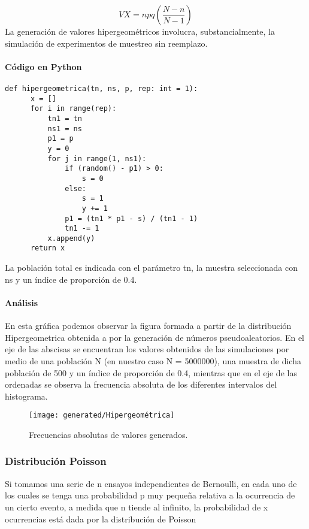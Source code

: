 \documentclass{article}
\begin{document}
  \begin{equation}
    VX = npq(\frac{N-n}{N-1})
    \end{equation}
  La generación de valores hipergeométricos involucra, substancialmente, la simulación de experimentos de muestreo sin reemplazo.

  \paragraph{Código en Python}
  \begin{lstlisting}[style = Python]
   def hipergeometrica(tn, ns, p, rep: int = 1):
      x = []
      for i in range(rep):
          tn1 = tn
          ns1 = ns
          p1 = p
          y = 0
          for j in range(1, ns1):
              if (random() - p1) > 0:
                  s = 0
              else:
                  s = 1
                  y += 1
              p1 = (tn1 * p1 - s) / (tn1 - 1)
              tn1 -= 1
          x.append(y)
      return x
  \end{lstlisting}
  La población total es indicada con el parámetro tn, la muestra seleccionada con ns y un índice de proporción de 0.4.

  \paragraph{Análisis\newline}

  En esta gráfica podemos observar la figura formada a partir de la distribución Hipergeometrica obtenida a
  por la generación de números pseudoaleatorios. En el eje de las abscisas se encuentran los valores obtenidos de las
  simulaciones por medio de una población N (en nuestro caso N = 5000000), una muestra de dicha población de 500 y un
  índice de proporción de 0.4, mientras que en el eje de las  ordenadas se observa la frecuencia absoluta de los
  diferentes intervalos del histograma.
  \begin{figure}[h]
    \centering
    \texttt{[image: generated/Hipergeométrica]}
    \caption{Frecuencias absolutas de valores generados.}
  \end{figure}






  \subsubsection{Distribución Poisson}
  Si tomamos una serie de n ensayos independientes de Bernoulli, en cada uno de los cuales se tenga una probabilidad p muy pequeña relativa a la ocurrencia de un cierto evento,
  a medida que n tiende al infinito, la probabilidad de x ocurrencias está dada por la distribución de Poisson
\end{document}
